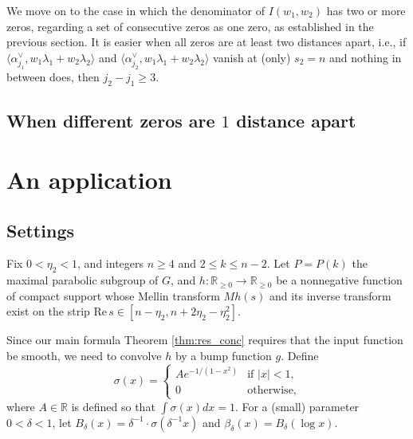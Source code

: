 \documentclass[11pt]{amsart}
\def\R{\mathbb{R}}
\numberwithin{theorem}{section}
\numberwithin{equation}{section}
\theoremstyle{remark}
\theoremstyle{definition}
\newcommand{\re}{\mathrm{Re}\,}
\begin{document}
{We move on to the case in which the denominator of $I(w_1,w_2)$ has two or more zeros, regarding a set of consecutive zeros as one zero, as established in the previous section. It is easier when all zeros are at least two distances apart, i.e., if $\langle \alpha^\vee_{j_1},w_1\lambda_1+w_2\lambda_2 \rangle$ and $\langle \alpha^\vee_{j_2},w_1\lambda_1+w_2\lambda_2 \rangle$ vanish at (only) $s_2=n$ and nothing in between does, then $j_2-j_1 \geq 3$.

\subsection{When different zeros are $1$ distance apart}
}%

\section{An application} \label{sec:app}


\subsection{Settings}

Fix $0 < \eta_2 < 1$, and integers $n \geq 4$ and $2 \leq k \leq n-2$. Let $P=P(k)$ the maximal parabolic subgroup of $G$, and $h:\R_{\geq 0} \rightarrow \R_{\geq 0}$ be a nonnegative function of compact support whose Mellin transform $Mh(s)$ and its inverse transform exist on the strip $\re s \in [n-\eta_2,n+2\eta_2-\eta_2^2]$.

Since our main formula Theorem \ref{thm:res_conc} requires that the input function be smooth, we need to convolve $h$ by a bump function $g$. Define
\begin{equation*}
\sigma(x) = \begin{cases} Ae^{-1/(1-x^2)} & \mbox{if $|x| < 1$}, \\ 0 & \mbox{otherwise,} \end{cases}
\end{equation*}
where $A\in\R$ is defined so that $\int\sigma(x)dx=1$. For a (small) parameter $0 < \delta < 1$, let $B_\delta(x) = \delta^{-1} \cdot \sigma(\delta^{-1}x)$ and $\beta_\delta(x) = B_\delta(\log x)$.
\end{document}
